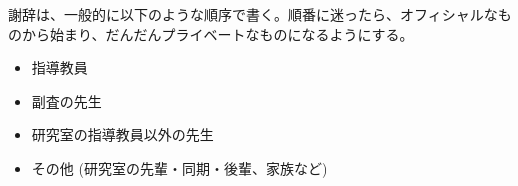 謝辞は、一般的に以下のような順序で書く。順番に迷ったら、オフィシャルなものから始まり、だんだんプライベートなものになるようにする。

\begin{itemize}
  \item 指導教員
  \item 副査の先生
  \item 研究室の指導教員以外の先生
  \item その他 (研究室の先輩・同期・後輩、家族など)
\end{itemize}
